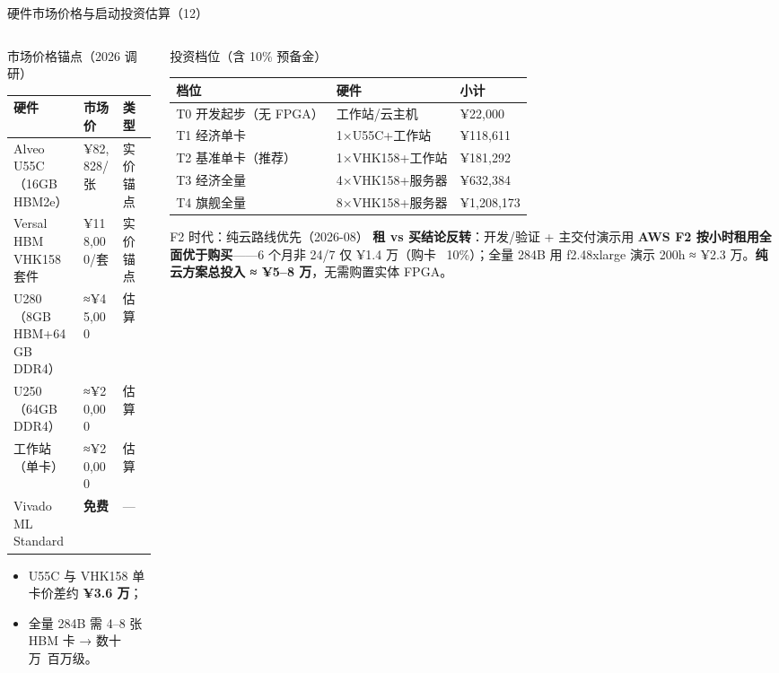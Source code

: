 \documentclass[aspectratio=169]{beamer}
\newcommand{\smalltable}[1]{\par\centering\scriptsize #1\par}
\begin{document}
\begin{frame}{硬件市场价格与启动投资估算（12）}
\begin{columns}[T]
\begin{column}{0.5\textwidth}
\begin{block}{市场价格锚点（2026 调研）}
\smalltable{%
\begin{tabular}{@{}lll@{}}
\toprule
硬件 & 市场价 & 类型 \\
\midrule
Alveo U55C（16GB HBM2e） & ¥82,828/张 & 实价锚点 \\
Versal HBM VHK158 套件 & ¥118,000/套 & 实价锚点 \\
U280（8GB HBM+64GB DDR4） & ≈¥45,000 & 估算 \\
U250（64GB DDR4） & ≈¥20,000 & 估算 \\
工作站（单卡） & ≈¥20,000 & 估算 \\
Vivado ML Standard & \textbf{免费} & — \\
\bottomrule
\end{tabular}}
\end{block}
\begin{itemize}
  \item U55C 与 VHK158 单卡价差约 \textbf{¥3.6 万}；
  \item 全量 284B 需 4–8 张 HBM 卡 → 数十万~百万级。
\end{itemize}
\end{column}
\begin{column}{0.48\textwidth}
\begin{block}{投资档位（含 10\% 预备金）}
\smalltable{%
\begin{tabular}{@{}lll@{}}
\toprule
档位 & 硬件 & 小计 \\
\midrule
T0 开发起步（无 FPGA） & 工作站/云主机 & ¥22,000 \\
T1 经济单卡 & 1×U55C+工作站 & ¥118,611 \\
T2 基准单卡（推荐） & 1×VHK158+工作站 & ¥181,292 \\
T3 经济全量 & 4×VHK158+服务器 & ¥632,384 \\
T4 旗舰全量 & 8×VHK158+服务器 & ¥1,208,173 \\
\bottomrule
\end{tabular}}
\end{block}
\begin{alertblock}{F2 时代：纯云路线优先（2026-08）}
\textbf{租 vs 买结论反转}：开发/验证 + 主交付演示用 \textbf{AWS F2 按小时租用全面优于购买}——6 个月非 24/7 仅 ¥1.4 万（购卡 ~10\%）；全量 284B 用 f2.48xlarge 演示 200h ≈ ¥2.3 万。\textbf{纯云方案总投入 ≈ ¥5–8 万}，无需购置实体 FPGA。
\end{alertblock}
\end{column}
\end{columns}
\end{frame}
\end{document}
